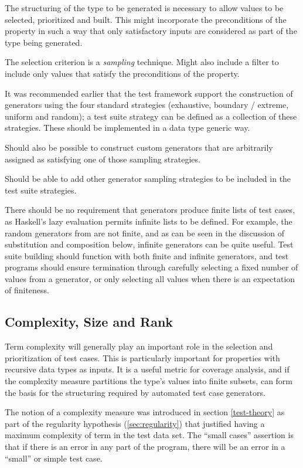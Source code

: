 The structuring of the type to be generated is necessary to
allow values to be selected, prioritized and built.
This might incorporate the preconditions of the property in such a way
that only satisfactory inputs are considered as part of the type being generated.

The selection criterion is a \emph{sampling} technique.
Might also include a filter to include only values that satisfy the preconditions of the property.

It was recommended earlier that the test framework support
the construction of generators using the four standard strategies
(exhaustive, boundary / extreme, uniform and random);
a test suite strategy can be defined as a collection of these strategies.
These should be implemented in a data type generic way.

Should also be possible to construct custom generators that 
are arbitrarily assigned as satisfying one of those sampling strategies.

Should be able to add other generator sampling strategies 
to be included in the test suite strategies.

There should be no requirement that generators produce finite lists of test cases,
as Haskell's lazy evaluation permits infinite lists to be defined.
For example, the random generators from \QC are not finite,
and as can be seen in the discussion of substitution and composition below,
infinite generators can be quite useful.
Test suite building should function with both finite and infinite generators,
and test programs should ensure termination through 
carefully selecting a fixed number of values from a generator,
or only selecting all values when there is an expectation of finiteness.

\subsection{ Complexity, Size and Rank }\label{sub:reqrank}

Term complexity will generally play an important role
in the selection and prioritization of test cases.
This is particularly important for
properties with recursive data types as inputs.
It is a useful metric for coverage analysis,
and if the complexity measure partitions the type's values into finite subsets,
can form the basis for the structuring required by automated test case generators.

The notion of a complexity measure was introduced in section \ref{test-theory}
as part of the regularity hypothesis  (\ref{sec:regularity})
that justified having a maximum complexity of term in the test data set.
The ``small cases'' assertion is that if there is an error in any part of the program,
there will be an error in a ``small'' or simple test case.

